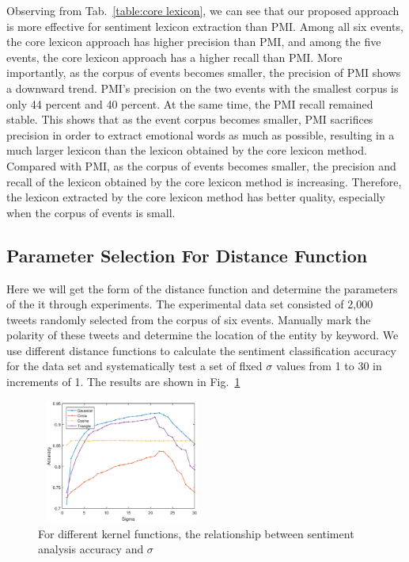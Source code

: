 \documentclass[runningheads]{llncs}
\begin{document}
Observing from Tab.~\ref{table:core lexicon}, we can see that our proposed approach is more effective for sentiment lexicon extraction than PMI. Among all six events, the core lexicon approach has higher precision than PMI, and among the five events, the core lexicon approach has a higher recall than PMI. More importantly, as the corpus of events becomes smaller, the precision of PMI shows a downward trend. PMI's precision on the two events with the smallest corpus is only 44 percent and 40 percent. At the same time, the PMI recall remained stable. This shows that as the event corpus becomes smaller, PMI sacrifices precision in order to extract emotional words as much as possible, resulting in a much larger lexicon than the lexicon obtained by the core lexicon method. Compared with PMI, as the corpus of events becomes smaller, the precision and recall of the lexicon obtained by the core lexicon method is increasing. Therefore, the lexicon extracted by the core lexicon method has better quality, especially when the corpus of events is small.

\subsection{Parameter Selection For Distance Function}
Here we will get the form of the distance function and determine the parameters of the it through experiments. The experimental data set consisted of 2,000 tweets randomly selected from the corpus of six events. Manually mark the polarity of these tweets and determine the location of the entity by keyword. We use different distance functions to calculate the sentiment classification accuracy for the data set and systematically test a set of flxed $\sigma$ values from 1 to 30 in increments of 1. The results are shown in Fig.~\ref{fig:sigma}

\vspace{-0.5cm}
\begin{figure}
    \centering
    \includegraphics[width=0.5\textwidth,height=1.6in]{sigma.eps}
    \setlength{\abovecaptionskip}{-0.1cm}
    \caption{For different kernel functions, the relationship between sentiment analysis accuracy and $\sigma$}\label{fig:sigma}
\end{figure}
\end{document}
